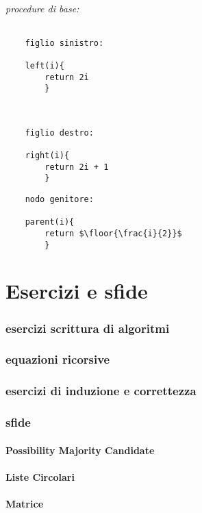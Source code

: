 \documentclass{article}
\DeclarePairedDelimiter\floor{\lfloor}{\rfloor}
\begin{document}
\paragraph{procedure di base:}

\begin{tabbing}
\begin{lstlisting}
    figlio sinistro:

    left(i){
        return 2i
        } 
\end{lstlisting}
\
\begin{lstlisting}
    figlio destro:

    right(i){
        return 2i + 1
        }
\end{lstlisting}
\begin{lstlisting}
    nodo genitore:

    parent(i){
        return $\floor{\frac{i}{2}}$
        }
\end{lstlisting}
    
\end{tabbing}

\part{Esercizi e sfide}
\section{esercizi scrittura di algoritmi}
\section{equazioni ricorsive}
\section{esercizi di induzione e correttezza}
\section{sfide}
\subsection{Possibility Majority Candidate}
\subsection{Liste Circolari}
\subsection{Matrice}
\end{document}
